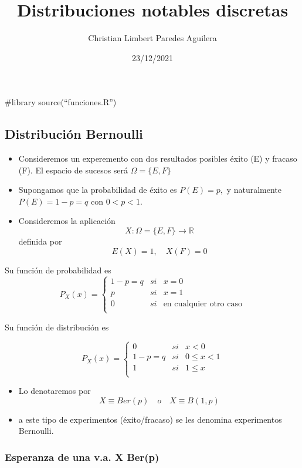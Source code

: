 \documentclass[
]{article}
\title{Distribuciones notables discretas}
\author{Christian Limbert Paredes Aguilera}
\date{23/12/2021}
\begin{document}
\maketitle

\#library source(``funciones.R'')

\hypertarget{distribuciuxf3n-bernoulli}{%
\subsection{Distribución Bernoulli}\label{distribuciuxf3n-bernoulli}}

\begin{itemize}
  \item Consideremos un experemento con dos resultados posibles éxito (E) y fracaso (F). El espacio de sucesos será $\Omega = \lbrace E,F\rbrace$
  \item Supongamos que la probabilidad de éxito es $P(E) = p,$ y naturalmente $P(E)=1-p=q$ con $0<p<1$.
  \item Consideremos la aplicación $$X:\Omega = \lbrace E,F\rbrace \longrightarrow \mathbb{R}$$
  definida por $$E(X)=1,\quad X(F)=0$$
\end{itemize}

Su función de probabilidad es \[P_X(x) = \left\{\begin{array}{rcl}
  1-p=q&si&x=0\\
  p&si&x=1\\
  0&si&\mbox{en cualquier otro caso}\\
\end{array}\right.\]

Su función de distribución es

\[P_X(x) = \left\{\begin{array}{rcl}
  0&si&x<0\\
  1-p=q&si&0\leq x<1\\
  1&si&1\leq x\\
\end{array}\right.\]

\begin{itemize}
  \item Lo denotaremos por $$X\equiv Ber(p) \quad o\quad X\equiv B(1,p)$$
  \item a este tipo de experimentos (éxito/fracaso) se les denomina experimentos Bernoulli.
\end{itemize}

\hypertarget{esperanza-de-una-v.a.-x-berp}{%
\subsubsection{Esperanza de una v.a. X
Ber(p)}\label{esperanza-de-una-v.a.-x-berp}}
\end{document}
